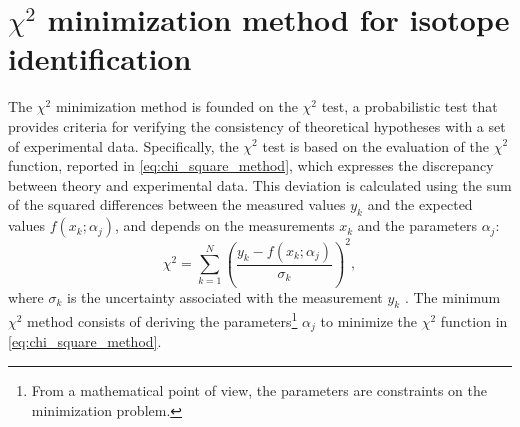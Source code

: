 \chapter{\texorpdfstring{$\chi^2$}{χ²} minimization method for isotope identification}\label{ch:chi_squared_min}
The $\chi^2$ minimization method is founded on the $\chi^2$ test, a probabilistic test that provides criteria for verifying the consistency of theoretical hypotheses with a set of experimental data. Specifically, the $\chi^2$ test is based on the evaluation of the $\chi^2$ function, reported in \autoref{eq:chi_square_method}, which expresses the discrepancy between theory and experimental data. This deviation is calculated using the sum of the squared differences between the measured values $y_k$ and the expected values $f\left(x_k;\alpha_j\right)$, and depends on the measurements $x_k$ and the parameters $\alpha_j$:
\begin{equation}
	\chi^2=\sum_{k=1}^N\left(\frac{y_k-f\left(x_k;\alpha_j\right)}{\sigma_k}\right)^2,
	\label{eq:chi_square_method}
\end{equation}
where $\sigma_k$ is the uncertainty associated with the measurement $y_k$ \cite{Fornasini2008}. The minimum $\chi^2$ method consists of deriving the parameters\footnote{From a mathematical point of view, the parameters are constraints on the minimization problem.} $\alpha_j$ to minimize the $\chi^2$ function in \autoref{eq:chi_square_method}.

